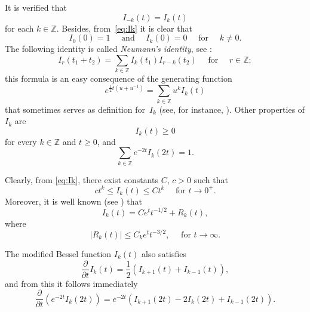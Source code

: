 \documentclass[11pt]{amsart}
\numberwithin{equation}{section}
\newcommand{\Z}{\mathbb{Z}}
\theoremstyle{plain}
\theoremstyle{remark}
\begin{document}
It is verified that
\begin{equation}
\label{eq:simetriak}
I_{-k}(t) = I_k(t)
\end{equation}
for each $k \in \Z$. Besides, from~\eqref{eq:Ik} it is clear that
\begin{equation}
\label{eq:Ik0}
I_0(0) = 1 \quad \text{ and } \quad I_k(0) = 0 \quad \text{ for } \quad k \ne 0.
\end{equation}
The following identity is called \textit{Neumann's identity}, see \cite[Chapter~II, formula~(7.10)]{Feller}:
\begin{equation}
\label{eq:Neumann}
  I_{r}(t_1+t_2) = \sum_{k \in \Z} I_k(t_1) I_{r-k}(t_2) \quad \text{ for } \quad r \in \Z;
\end{equation}
this formula is an easy consequence of the generating function
\[
  e^{\frac12 t (u+u^{-1})} = \sum_{k \in \Z} u^k I_{k}(t)
\]
that sometimes serves as definition for~$I_k$ (see, for instance, \cite[formula 10.35.1]{OlMax}).
Other properties of $I_k$ are
\begin{equation}
\label{eq:Ik>0}
  I_k(t) \ge 0
\end{equation}
for every $k \in \Z$ and $t\ge0$, and
\begin{equation}
\label{eq:sumIk}
  \sum_{k \in \Z} e^{-2t} I_k(2t) = 1.
\end{equation}

Clearly, from \eqref{eq:Ik}, there exist constants $C$, $c>0$ such that
\begin{equation}
\label{eq:asymptotics-zero}
c t^k\le I_k(t)\le C t^k \quad \text{ for } t\to0^+.
\end{equation}
Moreover, it is well known (see \cite{Lebedev}) that
\begin{equation}
\label{eq:asymptotics-infinite}
I_k(t)=C e^t t^{-1/2}+ R_k(t),
\end{equation}
where
\[
|R_k(t)|\le C_k e^tt^{-3/2}, \quad \text{ for } t\to\infty.
\]

The modified Bessel function $I_k(t)$ also satisfies
\[
  \frac{\partial}{\partial t} I_k(t) = \frac{1}{2} (I_{k+1}(t) + I_{k-1}(t)),
\]
and from this it follows immediately
\begin{equation}
\label{eq:derivadaCalort}
  \frac{\partial}{\partial t} (e^{-2t} I_k(2t)) = e^{-2t} (I_{k+1}(2t) - 2I_{k}(2t) + I_{k-1}(2t)).
\end{equation}
\end{document}
